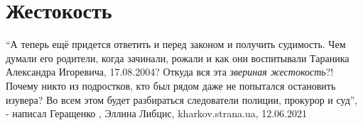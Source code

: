  
 
 
 
 
\chapter{Жестокость}
\label{sec:slova.zhestokost}

\enquote{А теперь ещё придется ответить и перед законом и получить судимость.
Чем думали его родители, когда зачинали, рожали и как они воспитывали Тараника
Александра Игоревича, 17.08.2004? Откуда вся эта \emph{звериная жестокость}?!
Почему никто из подростков, кто был рядом даже не попытался остановить изувера?
Во всем этом будет разбираться следователи полиции, прокурор и суд}, - написал
Геращенко
, 
Эллина Либцис, kharkov.strana.ua, 12.06.2021

